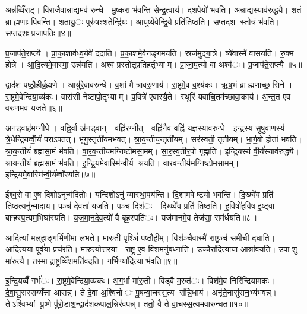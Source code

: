 अन्न॑व्विँ॒राट्। वि॒राजै॒वान्नाद्य॒मव॑ रुन्धे। मु॒ष्क॒रा भ॑वन्ति सेन्द्र॒त्वाय॑। द॒श॒पेयो॑ भवति। अ॒न्नाद्य॒स्याव॑रुद्ध्यै। श॒तं ब्राह्म॒णाः पि॑बन्ति। श॒तायु॒ः पुरु॑षश्श॒तेन्द्रि॑यः। आयु॑ष्ये॒वेन्द्रि॒ये प्रति॑तिष्ठति। स॒प्त॒द॒श स्तो॒त्रं भ॑वति। स॒प्त॒द॒शः प्र॒जाप॑तिः॥४॥

प्र॒जाप॑ते॒राप्त्यै। प्रा॒का॒शाव॑ध्व॒र्यवे॑ ददाति। प्र॒का॒शमे॒वैन॑ङ्गमयति। स्रज॑मुद्गा॒त्रे। व्ये॑वास्मै॑ वासयति। रु॒क्म होत्रे। आ॒दि॒त्यमे॒वास्मा॒ उन्न॑यति। अश्वं॑ प्रस्तोतृप्रतिह॒र्तृभ्याम्। प्रा॒जा॒प॒त्यो वा अश्व॑ः। प्र॒जाप॑ते॒राप्त्यै॥५॥

द्वाद॑श पष्ठौ॒हीर्ब्र॒ह्मणे। आयु॑रे॒वाव॑रुन्धे। व॒शां मैत्रावरु॒णाय॑। रा॒ष्ट्रमे॒व व॒श्य॑कः। ऋ॒ष॒भं ब्राह्मणाच्छ॒सिने। रा॒ष्ट्रमे॒वेन्द्रि॑या॒व्य॑कः। वास॑सी नेष्टापो॒तृभ्याम्। प॒वित्रे॑ ए॒वास्यै॒ते। स्थूरि॑ यवाचि॒तम॑च्छावा॒काय॑। अ॒न्त॒त ए॒व वरु॑ण॒मव॑ यजते॥६॥

अ॒नड्वाह॑म॒ग्नीधे। वह्नि॒र्वा अ॑न॒ड्वान्। वह्नि॑र॒ग्नीत्। वह्नि॑नै॒व वह्नि॑ य॒ज्ञस्याव॑रुन्धे। इन्द्र॑स्य सुषुवा॒णस्य॑ त्रे॒धेन्द्रि॒यव्वीँ॒र्यं॑ परा॑ऽपतत्। भृगु॒स्तृती॑यमभवत्। श्रा॒य॒न्तीय॒न्तृती॑यम्। सर॑स्वती॒ तृती॑यम्। भा॒र्ग॒वो होता॑ भवति। श्रा॒य॒न्तीयं॑ ब्रह्मसा॒मं भ॑वति। वा॒र॒व॒न्तीय॑मग्निष्टोमसा॒मम्। सा॒र॒स्व॒तीर॒पो गृ॑ह्णाति। इ॒न्द्रि॒यस्य॑ वी॒र्य॑स्याव॑रुद्ध्यै। श्रा॒य॒न्तीयं॑ ब्रह्मसा॒मं भ॑वति। इ॒न्द्रि॒यमे॒वास्मि॑न्वी॒र्य श्रयति। वा॒र॒व॒न्तीय॑मग्निष्टोमसा॒मम्। इ॒न्द्रि॒यमे॒वास्मि॑न्वी॒र्य॑व्वाँरयति॥७॥


ई॒श्व॒रो वा ए॒ष दिशोऽनून्म॑दितोः। यन्दिशोऽनु॑ व्यास्था॒पय॑न्ति। दि॒शामवेष्टयो भवन्ति। दि॒ख्ष्वे॑व प्रति॑ तिष्ठ॒त्यनु॑न्मादाय। पञ्च॑ दे॒वता॑ यजति। पञ्च॒ दिश॑ः। दि॒ख्ष्वे॑व प्रति॑ तिष्ठति। ह॒विषो॑हविष इ॒ष्ट्वा बा॑ऱ्हस्प॒त्यम॒भिघा॑रयति। य॒ज॒मा॒न॒दे॒व॒त्यो॑ वै बृह॒स्पति॑ः। यज॑मानमे॒व तेज॑सा॒ सम॑र्धयति॥८॥

आ॒दि॒त्यां म॒ल्॒हाङ्ग॒र्भिणी॒मा ल॑भते। मा॒रु॒तीं पृश्ञिं॑ पष्ठौ॒हीम्। विश॑ञ्चैवास्मै॑ रा॒ष्ट्रञ्च॑ स॒मीची॑ दधाति। आ॒दि॒त्यया॒ पूर्व॑या॒ प्रच॑रति। मा॒रु॒त्योत्त॑रया। रा॒ष्ट्र ए॒व विश॒मनु॑बध्नाति। उ॒च्चैरा॑दि॒त्याया॒ आश्रा॑वयति। उ॒पा॒शु मा॑रु॒त्यै। तस्माद्रा॒ष्ट्रव्विँश॒मति॑वदति। ग॒र्भिण्या॑दि॒त्या भ॑वति॥९॥

इ॒न्द्रि॒यव्वैँ गर्भ॑ः। रा॒ष्ट्रमे॒वेन्द्रि॑या॒व्य॑कः। अ॒ग॒र्भा मा॑रु॒ती। विड्वै म॒रुत॑ः। विश॑मे॒व निरि॑न्द्रियामकः। दे॒वा॒सु॒रास्सय्यँ॑त्ता आसन्न्। ते दे॒वा अ॒श्विनोः पू॒षन्वा॒चस्स॒त्य स॑न्नि॒धाय॑। अनृ॑ते॒नासु॑रान॒भ्य॑भवन्न्। तेऽश्विभ्यां पू॒ष्णे पु॑रो॒डाश॒न्द्वाद॑शकपाल॒न्निर॑वपन्न्। ततो॒ वै ते वा॒चस्स॒त्यमवा॑रुन्धत॥१०॥

